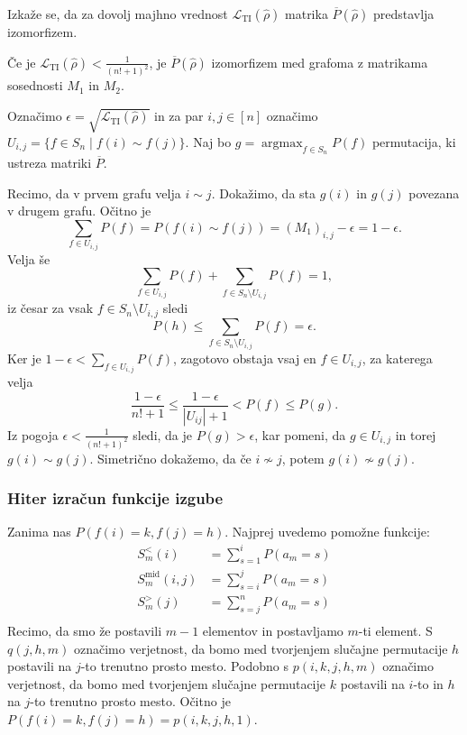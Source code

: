 \documentclass[mat2, tisk]{fmfdelo}
\newcommand{\Loss}[1]{\mathcal L _\text{#1}}
\begin{document}
Izkaže se, da za dovolj majhno vrednost $\Loss{TI}(\hat \rho)$
matrika $\overline{P}(\hat \rho)$ predstavlja izomorfizem.
\begin{lema}
  Če je $\Loss{TI}(\hat \rho) < \frac{1}{(n! + 1)^2}$, je
  $\overline{P}(\hat \rho)$ izomorfizem med grafoma z matrikama
  sosednosti $M_1$ in $M_2$.
\end{lema}
\begin{dokaz}
  Označimo $\epsilon = \sqrt{\Loss{TI}(\hat \rho)}$ in
  za par $i, j \in  [n]$ označimo
  $U_{i,j} = \{f \in S_n \mid f(i) \sim f(j)\} $. Naj bo
  $g = \operatorname{argmax}_{f \in S_n} P(f)$ permutacija, ki
  ustreza matriki $\overline{P}$.

  Recimo, da v prvem grafu velja $i \sim j$. Dokažimo, da
  sta $g(i)$ in $g(j)$ povezana v drugem grafu.
  Očitno je
  $$
  \sum_{f \in U_{i,j}}P(f) =  P(f(i) \sim f(j)) =(M_1)_{i,j} -
  \epsilon  =1 - \epsilon.
  $$
  Velja še
  $$
  \sum_{f \in U_{i,j}} P(f) + \sum_{f \in S_n \setminus U_{i,j}} P(f) = 1,
  $$
  iz česar za vsak $f \in S_n\setminus U_{i,j}$ sledi
  $$
  P(h) \leq \sum_{f \in S_n\setminus U_{i,j}} P(f) = \epsilon.
  $$
  Ker je $1 - \epsilon < \sum_{f \in U_{i,j}} P(f)$, zagotovo obstaja
  vsaj en $f \in U_{i,j}$, za katerega velja
  $$
  \frac{1-\epsilon}{n! +1 } \leq \frac{1-\epsilon}{|U_{ij}| +1} <
  P(f) \leq P(g).
  $$
  Iz pogoja $\epsilon < \frac{1}{(n! + 1)^2}$ sledi,
  da je $P(g) >
  \epsilon$, kar pomeni, da $g \in U_{i,j}$ in torej $g(i) \sim g(j)$.
  Simetrično dokažemo, da če $i \not\sim j$, potem $g(i) \not\sim g(j)$.
\end{dokaz}
\subsubsection{Hiter izračun funkcije izgube}
Zanima nas $P(f(i) = k, f(j) = h)$.
Najprej uvedemo pomožne funkcije:
\begin{align*}
  S_m^<(i) &= \sum_{s=1}^{i} P(a_m = s) \\
  S_m^\text{mid}(i,j) &= \sum_{s=i}^{j} P(a_m = s) \\
  S_m^>(j) &= \sum_{s=j}^{n} P(a_m = s) \\
\end{align*}
Recimo, da smo že postavili $m-1$ elementov
in postavljamo $m$-ti element. S
$q(j,h,m)$ označimo verjetnost, da bomo med
tvorjenjem slučajne permutacije $h$ postavili na
$j$-to trenutno prosto mesto. Podobno s $p(i, k, j, h,
m)$ označimo verjetnost, da bomo
med tvorjenjem slučajne permutacije $k$ postavili na
$i$-to in $h$ na $j$-to trenutno prosto mesto.
Očitno je $P(f(i) = k, f(j) = h) = p(i, k, j, h,1)$.
%
\end{document}
